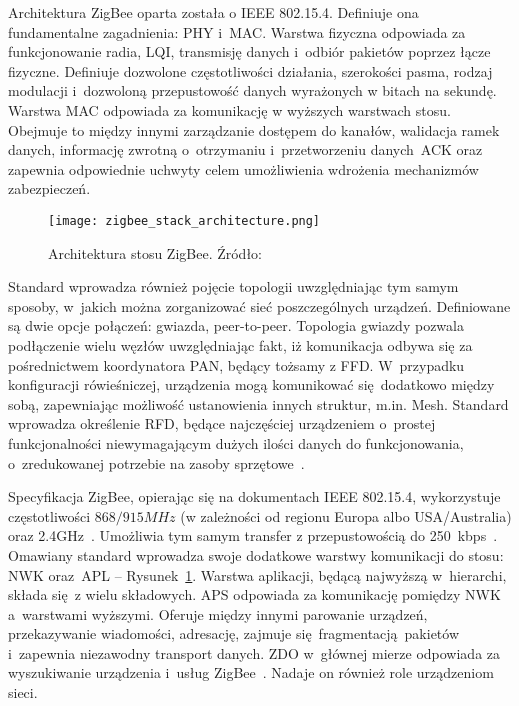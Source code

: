 Architektura ZigBee oparta została o IEEE 802.15.4. Definiuje ona fundamentalne zagadnienia:
\gls{PHY} i~\gls{MAC}. Warstwa fizyczna odpowiada za funkcjonowanie
radia, \gls{LQI}, transmisję danych i~odbiór pakietów poprzez łącze fizyczne. Definiuje dozwolone
częstotliwości działania, szerokości pasma, rodzaj modulacji i~dozwoloną przepustowość danych
wyrażonych w bitach na sekundę. Warstwa MAC odpowiada za komunikację w wyższych warstwach stosu.
Obejmuje to między innymi zarządzanie dostępem do kanałów, walidacja ramek danych, informację
zwrotną o~otrzymaniu i~przetworzeniu danych~\gls{ACK} oraz zapewnia odpowiednie
uchwyty celem umożliwienia wdrożenia mechanizmów zabezpieczeń.

\begin{figure}[!ht]
	\centering \texttt{[image: zigbee\_stack\_architecture.png]}
	\caption{Architektura stosu ZigBee. Źródło:~\cite{zigbee_alliance_zigbee_2017}}
	\label{rys:zigbee_stack_architecture}
\end{figure}

Standard wprowadza również pojęcie topologii uwzględniając tym samym sposoby,
w~jakich można zorganizować sieć poszczególnych urządzeń. Definiowane są dwie
opcje połączeń: gwiazda, peer-to-peer. Topologia gwiazdy pozwala podłączenie wielu węzłów
uwzględniając fakt, iż komunikacja odbywa się za pośrednictwem koordynatora \gls{PAN},
będący tożsamy z \gls{FFD}. W~przypadku konfiguracji rówieśniczej, urządzenia mogą 
komunikować się dodatkowo między sobą, zapewniając możliwość ustanowienia innych struktur, m.in. 
Mesh. Standard wprowadza określenie \gls{RFD}, będące najczęściej urządzeniem o~prostej funkcjonalności 
niewymagającym dużych ilości danych do funkcjonowania, o~zredukowanej potrzebie na 
zasoby sprzętowe~\cite{ieee_p80215_working_group_ieee_nodate}.

Specyfikacja ZigBee, opierając się na dokumentach IEEE 802.15.4, wykorzystuje częstotliwości
$868/915 MHz$ (w zależności od regionu Europa albo USA/Australia) oraz 2.4GHz~\cite{zigbee_alliance_zigbee_2017}.
Umożliwia tym samym transfer z przepustowością do 250~kbps~\cite{silicon_laboratories_ug10302_2021}.
Omawiany standard wprowadza swoje dodatkowe warstwy komunikacji do stosu: \gls{NWK} oraz~\gls{APL} --
Rysunek~\ref{rys:zigbee_stack_architecture}.
Warstwa aplikacji, będącą najwyższą w~hierarchi, składa się z wielu składowych. \gls{APS} odpowiada za
komunikację pomiędzy \gls{NWK} a~warstwami wyższymi. Oferuje między innymi parowanie urządzeń,
przekazywanie wiadomości, adresację, zajmuje się fragmentacją pakietów i~zapewnia niezawodny transport danych.
\gls{ZDO} w~głównej mierze odpowiada za wyszukiwanie urządzenia i~usług ZigBee~\cite{stmicroelectronics_an5506_2020, zigbee_alliance_zigbee_2017}.
Nadaje on również role urządzeniom sieci.

